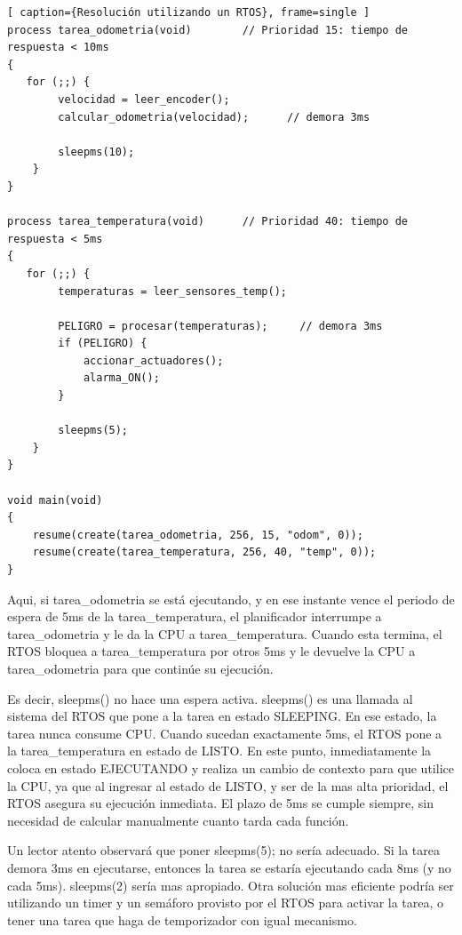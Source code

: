 \documentclass[output=paper, 
colorlinks,
citecolor=brown,
newtxmath
]{langscibook}
\begin{document}
\FloatBarrier
\begin{codefloat}[tp]
\begin{lstlisting}[ caption={Resolución utilizando un RTOS}, frame=single ]
process tarea_odometria(void)        // Prioridad 15: tiempo de respuesta < 10ms
{
   for (;;) {
        velocidad = leer_encoder();
        calcular_odometria(velocidad);      // demora 3ms

        sleepms(10);   
    }         
}

process tarea_temperatura(void)      // Prioridad 40: tiempo de respuesta < 5ms
{
   for (;;) {
        temperaturas = leer_sensores_temp();

        PELIGRO = procesar(temperaturas);     // demora 3ms
        if (PELIGRO) {
            accionar_actuadores();
            alarma_ON();	
        }

        sleepms(5);
    }
}

void main(void) 
{
    resume(create(tarea_odometria, 256, 15, "odom", 0));
    resume(create(tarea_temperatura, 256, 40, "temp", 0));
}
\end{lstlisting}
\end{codefloat}

Aqui, si tarea\_odometria se está ejecutando, y en ese
instante vence el periodo de espera de 5ms de la tarea\_temperatura, 
el planificador interrumpe a 
tarea\_odometria y le da la CPU a tarea\_temperatura. 
Cuando esta termina, el RTOS bloquea a tarea\_temperatura por otros 5ms y le 
devuelve la CPU a tarea\_odometria para que continúe su ejecución. 

Es decir, sleepms() no hace una espera activa. sleepms()
es una llamada al sistema del RTOS
que pone a la tarea en estado SLEEPING. En ese estado, la tarea nunca
consume CPU. Cuando sucedan exactamente 5ms, el RTOS pone a la tarea\_temperatura en estado de LISTO. En este punto, inmediatamente la coloca en estado EJECUTANDO y realiza un cambio de contexto para que utilice la CPU, 
ya que al ingresar al estado de LISTO, y ser de la mas alta prioridad, 
el RTOS asegura su ejecución inmediata.
El plazo de 5ms se cumple siempre, sin necesidad de calcular 
manualmente cuanto tarda cada función.

Un lector atento observará que poner sleepms(5); no sería adecuado.
Si la tarea demora 3ms en ejecutarse, entonces la tarea se estaría
ejecutando cada 8ms (y no cada 5ms). sleepms(2) sería mas apropiado.
Otra solución mas eficiente podría ser utilizando un timer y un semáforo
provisto por el RTOS para activar la tarea, o tener una tarea que haga
de temporizador con igual mecanismo.
\end{document}
